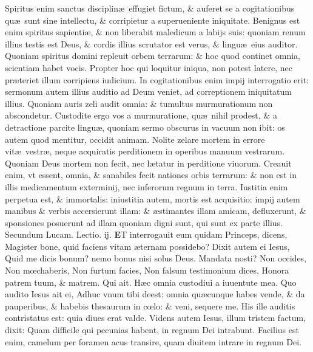 \documentclass[a5paper,10pt]{book}
\def\leftmarginnote{%
	\lrmarginnote{\hskip -\marginparsep \hskip -6.5em}}
\def\ae{æ}
\def\oe{œ}
\begin{document}
\begin{multicols*}{2}
Spiritus enim sanctus disciplin\ae \ effugiet fictum, \& auferet se a cogitationibus qu\ae \ sunt sine intellectu, \& corripietur a superueniente iniquitate.
Benignus est enim spiritus sapienti\ae , \& non liberabit maledicum a labijs suis: quoniam renum illius testis est Deus, \& cordis illius scrutator est verus, \& lingu\ae \ eius auditor.
Quoniam spiritus domini repleuit orbem terrarum: \& hoc quod continet omnia, scientiam habet vocis.
Propter hoc qui loquitur iniqua, non potest latere, nec pr\ae teriet illum corripiens iudicium.
In cogitationibus enim impij interrogatio erit: sermonum autem illius auditio ad Deum veniet, ad correptionem iniquitatum illius.
Quoniam auris zeli audit omnia: \& tumultus murmurationum non abscondetur.
Custodite ergo vos a murmuratione, qu\ae \ nihil prodest, \& a detractione parcite lingu\ae , quoniam sermo obscurus in vacuum non ibit: os autem quod mentitur, occidit animam.
Nolite zelare mortem in errore vit\ae \ vestr\ae , neque acquiratis perditionem in operibus manuum vestrarum.
Quoniam Deus mortem non fecit, nec l\ae tatur in perditione viuorum. Creauit enim, vt essent, omnia, \& sanabiles fecit nationes orbis terrarum: \& non est in illis medicamentum exterminij, nec inferorum regnum in terra.
Iustitia enim perpetua est, \& immortalis: iniustitia autem, mortis est acquisitio: impij autem manibus \& verbis accersierunt illam: \& \ae stimantes illam amicam, defluxerunt, \& sponsiones posuerunt ad illam quoniam digni sunt, qui sunt ex parte illius.
\newline \color{red} Secundum Lucam. \hfill Lectio. ij. \color{black}
\vspace{-.25em}
\lettrine[lines=2]{\bfseries \color{red} E}{}T\leftmarginnote{\begin{flushright}c. 18.\\D\end{flushright}} interrogauit eum quidam Princeps, dicens, Magister bone, quid faciens vitam \ae ternam possidebo?
Dixit autem ei Iesus, Quid me dicis bonum? nemo bonus nisi solus Deus. Mandata nosti? Non occides, Non m\oe chaberis, Non furtum facies, Non falsum testimonium dices, Honora patrem tuum, \& matrem.
Qui ait. H\ae c omnia custodiui a iuuentute mea. Quo audito Iesus ait ei, Adhuc vnum tibi deest: omnia qu\ae cunque habes vende, \& da pauperibus, \&
habebis thesaurum in c\oe lo: \& veni, sequere me.
His ille auditis contristatus est: quia diues erat valde. Videns autem Iesus, illum tristem factum, dixit: Quam difficile qui pecunias habent, in regnum Dei intrabunt.
Facilius est enim, camelum per foramen acus transire, quam diuitem intrare in regnum Dei.

\end{multicols*}
\end{document}
